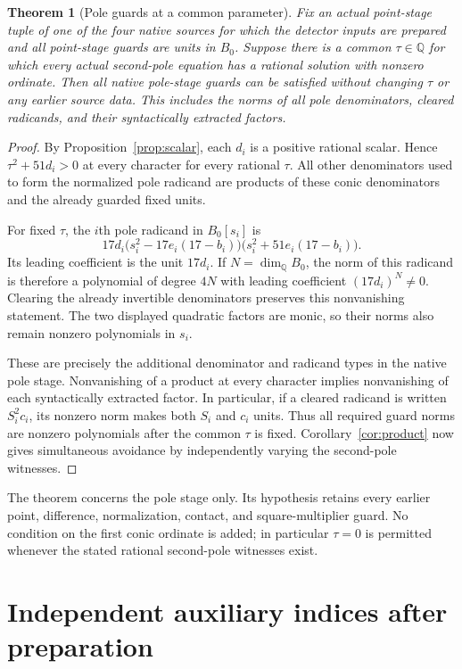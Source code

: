 \documentclass[11pt,a4paper]{article}
\newtheorem{theorem}{Theorem}[section]
\theoremstyle{remark}\newtheorem{remark}[theorem]{Remark}
\newcommand{\Q}{\mathbb Q}\newcommand{\Z}{\mathbb Z}
\begin{document}
\begin{theorem}[Pole guards at a common parameter]\label{thm:guards}
Fix an actual point-stage tuple of one of the four native sources for
which the detector inputs are prepared and all point-stage guards are
units in $B_0$. Suppose there is a common $\tau\in\Q$ for which
every actual second-pole equation has a rational solution with nonzero
ordinate. Then all native pole-stage guards can be satisfied without
changing $\tau$ or any earlier source data. This includes the norms
of all pole denominators, cleared radicands, and their syntactically
extracted factors.
\end{theorem}
\begin{proof}
By Proposition~\ref{prop:scalar}, each $d_i$ is a positive rational
scalar. Hence $\tau^2+51d_i>0$ at every character for every rational
$\tau$. All other denominators used to form the normalized pole
radicand are products of these conic denominators and the already
guarded fixed units.

For fixed $\tau$, the $i$th pole radicand in $B_0[s_i]$ is
\[
 17d_i\bigl(s_i^2-17e_i(17-b_i)\bigr)
       \bigl(s_i^2+51e_i(17-b_i)\bigr).
\]
Its leading coefficient is the unit $17d_i$. If $N=\dim_\Q B_0$,
the norm of this radicand is therefore a polynomial of degree $4N$
with leading coefficient $(17d_i)^N\ne0$. Clearing the already
invertible denominators preserves this nonvanishing statement.
The two displayed quadratic factors are monic, so their norms also
remain nonzero polynomials in $s_i$.

These are precisely the additional denominator and radicand types in
the native pole stage. Nonvanishing of a product at every character
implies nonvanishing of each syntactically extracted factor. In
particular, if a cleared radicand is written $S_i^2c_i$, its nonzero
norm makes both $S_i$ and $c_i$ units. Thus all required guard norms
are nonzero polynomials after the common $\tau$ is fixed.
Corollary~\ref{cor:product} now gives simultaneous avoidance by
independently varying the second-pole witnesses.
\end{proof}

The theorem concerns the pole stage only. Its hypothesis retains every
earlier point, difference, normalization, contact, and square-multiplier
guard. No condition on the first conic ordinate is added; in particular
$\tau=0$ is permitted whenever the stated rational second-pole witnesses
exist.

\section{Independent auxiliary indices after preparation}
\end{document}
